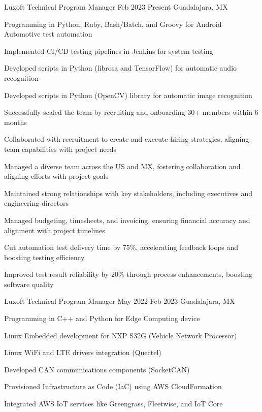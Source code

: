 \documentclass{resume} %
\begin{document}
\job
    {Luxoft}
    {Technical Program Manager}
    {Feb 2023}
    {Present}
    {Guadalajara, MX}
    {
    \begin{itemize-bullets}
    \item{Programming in Python, Ruby, Bash/Batch, and Groovy for Android Automotive test automation}
    \item{Implemented CI/CD testing pipelines in Jenkins for system testing}
    \item{Developed scripts in Python (librosa and TensorFlow) for automatic audio recognition}
    \item{Developed scripts in Python (OpenCV) library for automatic image recognition}
    \item{Successfully scaled the team by recruiting and onboarding 30+ members within 6 months}
    \item{Collaborated with recruitment to create and execute hiring strategies, aligning team capabilities with project needs}
    \item{Managed a diverse team across the US and MX, fostering collaboration and aligning efforts with project goals}
    \item{Maintained strong relationships with key stakeholders, including executives and engineering directors}
    \item{Managed budgeting, timesheets, and invoicing, ensuring financial accuracy and alignment with project timelines}
    \item{Cut automation test delivery time by 75\%, accelerating feedback loops and boosting testing efficiency}
    \item{Improved test result reliability by 20\% through process enhancements, boosting software quality}
    \end{itemize-bullets}
    }


\job
    {Luxoft}
    {Technical Program Manager}
    {May 2022}
    {Feb 2023}
    {Guadalajara, MX}
    {
    \begin{itemize-bullets}
    \item{Programming in C++ and Python for Edge Computing device}
    \item{Linux Embedded development for NXP S32G (Vehicle Network Processor)}
    \item{Linux WiFi and LTE drivers integration (Quectel)}
    \item{Developed CAN communications components (SocketCAN)}
    \item{Provisioned Infrastructure as Code (IaC) using AWS CloudFormation}
    \item{Integrated AWS IoT services like Greengrass, Fleetwise, and IoT Core}
    \end{itemize-bullets}
    }
\end{document}
